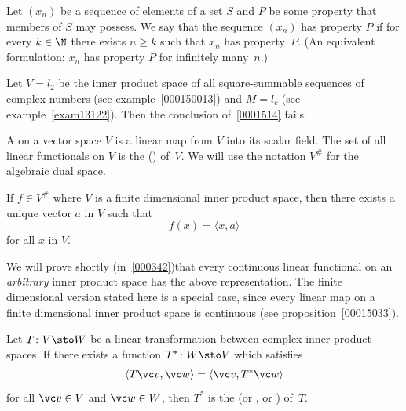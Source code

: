 \begin{defn}\label{C013131} Let $(x_n)$ be a sequence of elements of a set $S$ and $P$ be some
property that members of $S$ may possess.  We say that the sequence $(x_n)$
 has property $P$ if for every $k \in \N$ there exists $n \ge k$ such that
$x_n$ has property~$P$. (An equivalent formulation: $x_n$ has property $P$ for infinitely
many~$n$.)
\end{defn}

\begin{exam}\label{exam13132} Let $V = l_2$ be the inner product space of all square-summable sequences of complex numbers
(see example~\ref{000150013}) and $M = l_c$ (see example~\ref{exam13122}).  Then the conclusion of~\ref{0001514} fails.
\end{exam}

\begin{defn}\label{def_alg_dual} A
 on a vector space $V$ is a linear map from $V$ into its scalar
field. The set of all linear functionals on $V$ is the
()  of~$V$.  We will use the
notation $V^{\#}$ for the algebraic dual space.
\end{defn}

\begin{thm}\label{0001601} If $f \in V^{\#}$ where $V$ is a
finite dimensional inner product space, then there exists a unique vector $a$ in $V$ such
that
    \[ f(x) = \langle x,a \rangle \]
for all $x$ in $V$.
\end{thm}

We will prove shortly (in~\ref{000342})that every continuous linear functional on an \emph{arbitrary} inner
product space has the above representation. The finite dimensional version stated here is a special case, since
every linear map on a finite dimensional inner product space is continuous (see proposition~\ref{00015033}).

\begin{defn}\label{0001602} Let $T\colon V \sto W$ be a linear transformation between complex
inner product spaces. If there exists a function $T^*\colon W \sto V$ which satisfies
   \[ \langle T\vc v,\vc w \rangle = \langle \vc v,T^*\vc w \rangle \]
for all $\vc v \in V$ and $\vc w \in W$, then $T^*$ is the
 (or , or ) of~$T$.
\end{defn}

